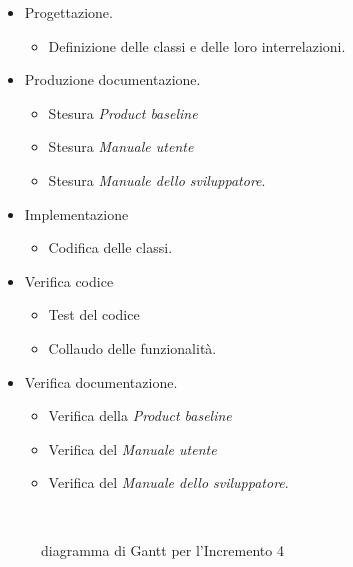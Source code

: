 \documentclass[../piano-di-progetto.tex]{subfiles}
\begin{document}
\begin{itemize}
  \item Progettazione.
  \begin{itemize}
    \item Definizione delle classi e delle loro interrelazioni.
  \end{itemize}
  \item Produzione documentazione.
  \begin{itemize}
    \item Stesura \textit{Product baseline}
    \item Stesura \textit{Manuale utente}
    \item Stesura \textit{Manuale dello sviluppatore}.
  \end{itemize}
  \item Implementazione
  \begin{itemize}
    \item Codifica delle classi.
  \end{itemize}
  \item Verifica codice
  \begin{itemize}
    \item Test del codice
    \item Collaudo delle funzionalità.
  \end{itemize}
  \item Verifica documentazione.
  \begin{itemize}
    \item Verifica della \textit{Product baseline}
    \item Verifica del \textit{Manuale utente}
    \item Verifica del \textit{Manuale dello sviluppatore}.
  \end{itemize}
\end{itemize}
\begin{figure}[H]
  \centering
  
  \caption{diagramma di Gantt per l'Incremento 4}%
~~\label{fig:gantt_incremento_4}
\end{figure}
\end{document}
